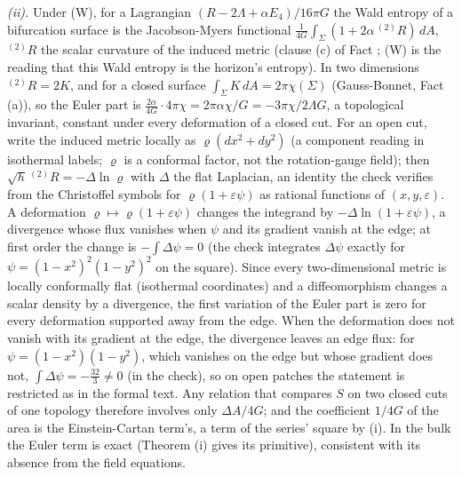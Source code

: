 \emph{(ii).} Under (W), for a Lagrangian $(R - 2\Lambda + \alpha E_{4})/16\pi G$ the Wald entropy of a bifurcation surface is the Jacobson-Myers functional $\frac{1}{4G}\int_{\Sigma}(1 + 2\alpha\,{}^{(2)}R)\,dA$, ${}^{(2)}R$ the scalar curvature of the induced metric (clause (c) of Fact ; (W) is the reading that this Wald entropy is the horizon's entropy). In two dimensions ${}^{(2)}R = 2K$, and for a closed surface $\int_{\Sigma}K\,dA = 2\pi\chi(\Sigma)$ (Gauss-Bonnet, Fact (a)), so the Euler part is $\frac{2\alpha}{4G}\cdot 4\pi\chi = 2\pi\alpha\chi/G = -3\pi\chi/2\Lambda G$, a topological invariant, constant under every deformation of a closed cut. For an open cut, write the induced metric locally as $\varrho(dx^{2} + dy^{2})$ (a component reading in isothermal labels; $\varrho$ is a conformal factor, not the rotation-gauge field); then $\sqrt{h}\,{}^{(2)}R = -\Delta\ln\varrho$ with $\Delta$ the flat Laplacian, an identity the check verifies from the Christoffel symbols for $\varrho(1 + \varepsilon\psi)$ as rational functions of $(x, y, \varepsilon)$. A deformation $\varrho \mapsto \varrho(1 + \varepsilon\psi)$ changes the integrand by $-\Delta\ln(1 + \varepsilon\psi)$, a divergence whose flux vanishes when $\psi$ and its gradient vanish at the edge; at first order the change is $-\int\Delta\psi = 0$ (the check integrates $\Delta\psi$ exactly for $\psi = (1 - x^{2})^{2}(1 - y^{2})^{2}$ on the square). Since every two-dimensional metric is locally conformally flat (isothermal coordinates) and a diffeomorphism changes a scalar density by a divergence, the first variation of the Euler part is zero for every deformation supported away from the edge. When the deformation does not vanish with its gradient at the edge, the divergence leaves an edge flux: for $\psi = (1 - x^{2})(1 - y^{2})$, which vanishes on the edge but whose gradient does not, $\int\Delta\psi = -\tfrac{32}{3} \neq 0$ (in the check), so on open patches the statement is restricted as in the formal text. Any relation that compares $S$ on two closed cuts of one topology therefore involves only $\Delta A/4G$; and the coefficient $1/4G$ of the area is the Einstein-Cartan term's, a term of the series' square by (i). In the bulk the Euler term is exact (Theorem (i) gives its primitive), consistent with its absence from the field equations.

